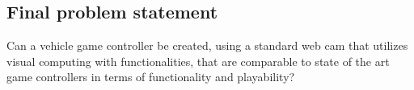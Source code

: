 \subsection{Final problem statement}
Can a vehicle game controller be created, using a standard web cam that utilizes visual computing with functionalities, that are comparable to state of the art game controllers in terms of functionality and playability?